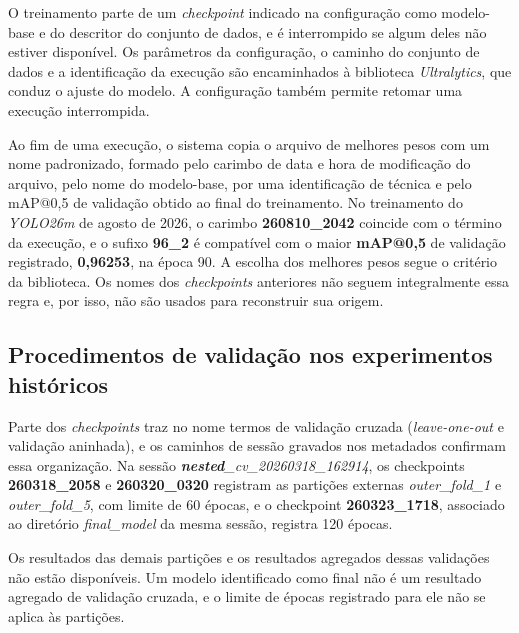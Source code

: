O treinamento parte de um \textit{checkpoint} indicado na configura\c{c}\~ao como modelo-base e do descritor do conjunto de dados, e \'e interrompido se algum deles n\~ao estiver dispon\'ivel. Os par\^ametros da configura\c{c}\~ao, o caminho do conjunto de dados e a identifica\c{c}\~ao da execu\c{c}\~ao s\~ao encaminhados \`a biblioteca \textit{Ultralytics}, que conduz o ajuste do modelo. A configura\c{c}\~ao tamb\'em permite retomar uma execu\c{c}\~ao interrompida.

Ao fim de uma execu\c{c}\~ao, o sistema copia o arquivo de melhores pesos com um nome padronizado, formado pelo carimbo de data e hora de modifica\c{c}\~ao do arquivo, pelo nome do modelo-base, por uma identifica\c{c}\~ao de t\'ecnica e pelo mAP@0,5 de valida\c{c}\~ao obtido ao final do treinamento. No treinamento do \textit{YOLO26m} de agosto de 2026, o carimbo \textbf{260810\_2042} coincide com o t\'ermino da execu\c{c}\~ao, e o sufixo \textbf{96\_2} \'e compat\'ivel com o maior \textbf{mAP@0,5} de valida\c{c}\~ao registrado, \textbf{0,96253}, na \'epoca 90. A escolha dos melhores pesos segue o crit\'erio da biblioteca. Os nomes dos \textit{checkpoints} anteriores n\~ao seguem integralmente essa regra e, por isso, n\~ao s\~ao usados para reconstruir sua origem.

\subsection{Procedimentos de valida\c{c}\~ao nos experimentos hist\'oricos}
\label{sec:procedimentos-validacao-historicos}

Parte dos \textit{checkpoints} traz no nome termos de valida\c{c}\~ao cruzada (\textit{leave-one-out} e valida\c{c}\~ao aninhada), e os caminhos de sess\~ao gravados nos metadados confirmam essa organiza\c{c}\~ao. Na sess\~ao \textit{\textbf{nested}\_cv\_20260318\_162914}, os checkpoints \textbf{260318\_2058} e \textbf{260320\_0320} registram as parti\c{c}\~oes externas \textit{outer\_fold\_1} e \textit{outer\_fold\_5}, com limite de 60 \'epocas, e o checkpoint \textbf{260323\_1718}, associado ao diret\'orio \textit{final\_model} da mesma sess\~ao, registra 120 \'epocas.

Os resultados das demais parti\c{c}\~oes e os resultados agregados dessas valida\c{c}\~oes n\~ao est\~ao dispon\'iveis. Um modelo identificado como final n\~ao \'e um resultado agregado de valida\c{c}\~ao cruzada, e o limite de \'epocas registrado para ele n\~ao se aplica \`as parti\c{c}\~oes.


